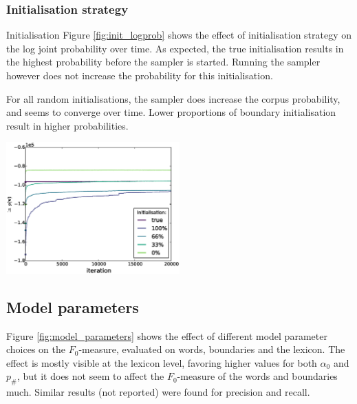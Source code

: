 \subsubsection{Initialisation strategy}
Initialisation
Figure \ref{fig:init_logprob} shows the effect of initialisation strategy on the log joint probability over time. As expected, the true initialisation results in the highest probability before the sampler is started. Running the sampler however does not increase the probability for this initialisation.

For all random initialisations, the sampler does increase the corpus probability, and seems to converge over time. Lower proportions of boundary initialisation result in higher probabilities.

\begingroup
    \centering
    \includegraphics[width=0.5\textwidth]{images/initialisation-log_prob}
    \label{fig:init_logprob}
\endgroup

\subsection{Model parameters}

Figure \ref{fig:model_parameters} shows the effect of different model parameter choices on the $F_0$-measure, evaluated on words, boundaries and the lexicon. The effect is mostly visible at the lexicon level, favoring higher values for both $\alpha_0$ and $p_\#$, but it does not seem to affect the $F_0$-measure of the words and boundaries much. Similar results (not reported) were found for precision and recall.

